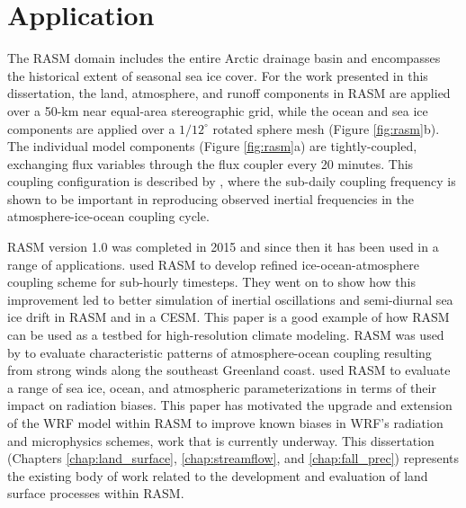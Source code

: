 \section{Application}

The RASM domain includes the entire Arctic drainage basin and encompasses the historical extent of seasonal sea ice cover.
For the work presented in this dissertation, the land, atmosphere, and runoff components in RASM are applied over a 50-km near equal-area stereographic grid, while the ocean and sea ice components are applied over a $1/12^{\circ}$ rotated sphere mesh (Figure \ref{fig:rasm}b).
The individual model components (Figure \ref{fig:rasm}a) are tightly-coupled, exchanging flux variables through the flux coupler every 20 minutes.
This coupling configuration is described by \citet{Roberts_2015a}, where the sub-daily coupling frequency is shown to be important in reproducing observed inertial frequencies in the atmosphere-ice-ocean coupling cycle.

RASM version 1.0 was completed in 2015 and since then it has been used in a range of applications.
\citet{Roberts_2015a} used RASM to develop refined ice-ocean-atmosphere coupling scheme for sub-hourly timesteps.
They went on to show how this improvement led to better simulation of inertial oscillations and semi-diurnal sea ice drift in RASM and in a CESM.
This paper is a good example of how RASM can be used as a testbed for high-resolution climate modeling.
RASM was used by \citet{DuVivier_2016} to evaluate characteristic patterns of atmosphere-ocean coupling resulting from strong winds along the southeast Greenland coast.
\citet{Cassano_2016} used RASM to evaluate a range of sea ice, ocean, and atmospheric parameterizations in terms of their impact on radiation biases.
This paper has motivated the upgrade and extension of the WRF model within RASM to improve known biases in WRF's radiation and microphysics schemes, work that is currently underway.
This dissertation (Chapters \ref{chap:land_surface}, \ref{chap:streamflow}, and \ref{chap:fall_prec}) represents the existing body of work related to the development and evaluation of land surface processes within RASM.
